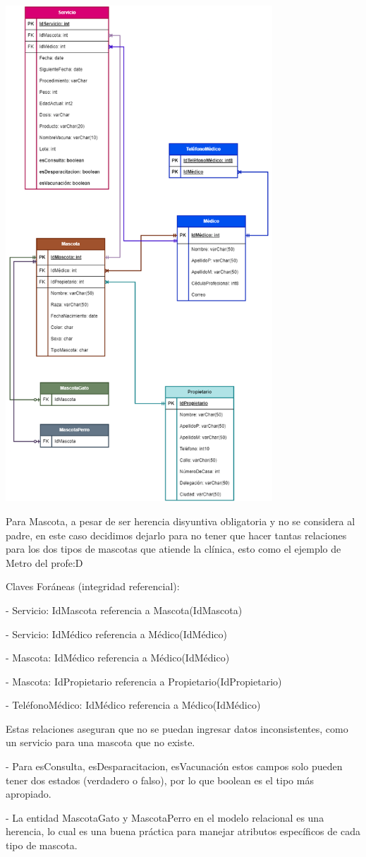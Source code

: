 \begin{center}
    \includegraphics[width=10cm]{resources/Ejercicio2b.png}
    \end{center}

Para Mascota, a pesar de ser herencia disyuntiva obligatoria y no se considera al padre, en este caso decidimos dejarlo para no tener que hacer tantas relaciones para los dos tipos de mascotas que atiende la clínica, esto como el ejemplo de Metro del profe:D 

Claves Foráneas (integridad referencial):

- Servicio: IdMascota referencia a Mascota(IdMascota)

- Servicio: IdMédico referencia a Médico(IdMédico)

- Mascota: IdMédico referencia a Médico(IdMédico)

- Mascota: IdPropietario referencia a Propietario(IdPropietario)

- TeléfonoMédico: IdMédico referencia a Médico(IdMédico)

Estas relaciones aseguran que no se puedan ingresar datos inconsistentes, como un servicio para una mascota que no existe.

- Para esConsulta, esDesparacitacion, esVacunación estos campos solo pueden tener dos estados (verdadero o falso), por lo que boolean es el tipo más apropiado.


- La entidad MascotaGato y MascotaPerro en el modelo relacional es una herencia, lo cual es una buena práctica para manejar atributos específicos de cada tipo de mascota.

